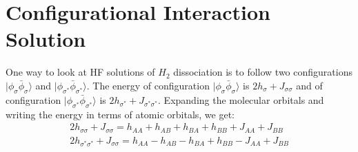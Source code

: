 \documentclass[11pt]{article}   	%
\begin{document}
\section{Configurational Interaction Solution}
	One way to look at HF solutions of $H_2$ dissociation is to follow two configurations $|\phi_{\sigma}\bar{\phi}_{\sigma}\rangle$ and $|\phi_{\sigma^*}\bar{\phi}_{\sigma^*}\rangle$. 
	The energy of configuration $|\phi_{\sigma}\bar{\phi}_{\sigma}\rangle$ is $2h_{\sigma} +J_{\sigma \sigma}$ and of configuration 
	$|\phi_{\sigma^*} \bar{\phi}_{\sigma^*}\rangle$ is $2h_{\sigma^*} +J_{\sigma^* \sigma^*}$. Expanding the molecular orbitals and 
	writing the energy in terms of atomic orbitals, we get:\\
	\begin{equation}
	\begin{split}
	2h_{\sigma \sigma} +J_{\sigma \sigma}=h_{AA}+h_{AB}+h_{BA}+h_{BB}+J_{AA}+J_{BB}\\
	2h_{\sigma^* \sigma^*} +J_{\sigma \sigma}=h_{AA}-h_{AB}-h_{BA}+h_{BB}-J_{AA}+J_{BB}\\
	\end{split}
	\end{equation}
\end{document}
